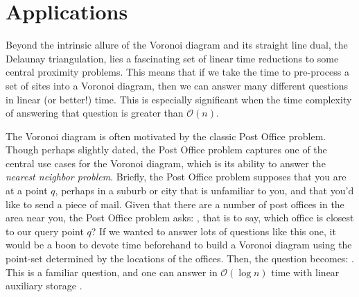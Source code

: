 \documentclass[12pt,twoside]{reedthesis}
\begin{document}
  \section{Applications} %
  \label{sec:applications_of_voronoi_and_delaunay_diagrams}
    Beyond the intrinsic allure of the Voronoi diagram and its straight line dual, the Delaunay triangulation, lies a fascinating set of linear time reductions to some central proximity problems. This means that if we take the time to pre-process a set of sites into a Voronoi diagram, then we can answer many different questions in linear (or better!) time. This is especially significant when the time complexity of answering that question is greater than $\mathcal{O}(n)$.\par 

    The Voronoi diagram is often motivated by the classic Post Office problem.  Though perhaps slightly dated, the Post Office problem captures one of the central use cases for the Voronoi diagram, which is its ability to answer the \emph{nearest neighbor problem}. Briefly, the Post Office problem supposes that you are at a point $q$, perhaps in a suburb or city that is unfamiliar to you, and that you'd like to send a piece of mail. Given that there are a number of post offices in the area near you,  the Post Office problem asks: , that is to say, which office is closest to our query point $q$? If we wanted to answer lots of questions like this one, it would be a boon to devote time beforehand to build a Voronoi diagram using the point-set determined by the locations of the offices. Then, the question becomes: . This is a familiar question, and one can answer in $\mathcal{O}(\log n)$ time with linear auxiliary storage \cite[p.~214]{shamos}.\par
\end{document}
